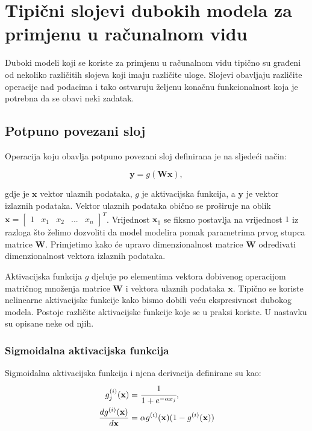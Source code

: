 \documentclass[times, utf8, diplomski, numeric]{fer}
\begin{document}
\section{Tipični slojevi dubokih modela za primjenu u računalnom vidu}
Duboki modeli koji se koriste za primjenu u računalnom vidu tipično su građeni od nekoliko različitih slojeva koji imaju različite uloge.
Slojevi obavljaju različite operacije nad podacima i tako ostvaruju željenu konačnu funkcionalnost koja je potrebna da se obavi neki zadatak.

\subsection{Potpuno povezani sloj}
Operacija koju obavlja potpuno povezani sloj definirana je na sljedeći način:

\begin{equation}
 \mathbf{y}=g(\mathbf{W}\mathbf{x}),
\end{equation}

\noindent gdje je $\mathbf{x}$ vektor ulaznih podataka, $g$ je aktivacijska funkcija, a  $\mathbf{y}$ je vektor izlaznih podataka. 
Vektor ulaznih podataka obično se proširuje na oblik $\mathbf{x} = \begin{bmatrix} 1 & x_1 & x_2 & ... & x_n \end{bmatrix}^T$.
Vrijednost $\mathbf{x}_1$ se fiksno postavlja na vrijednost $1$ iz razloga što želimo dozvoliti da model modelira pomak parametrima prvog stupca matrice $\mathbf{W}$.
Primjetimo kako će upravo dimenzionalnost matrice $\mathbf{W}$ određivati dimenzionalnost vektora izlaznih podataka.

Aktivacijska funkcija $g$ djeluje po elementima vektora dobivenog operacijom matričnog množenja matrice $\mathbf{W}$ i vektora ulaznih podataka $\mathbf{x}$.
Tipično se koriste nelinearne aktivacijske funkcije kako bismo dobili veću ekspresivnost dubokog modela.
Postoje različite aktivacijske funkcije koje se u praksi koriste. U nastavku su opisane neke od njih.

\subsubsection{Sigmoidalna aktivacijska funkcija}
Sigmoidalna aktivacijska funkcija i njena derivacija definirane su kao: 
\begin{align}
 g^{(i)}_j(\mathbf{x})&=\cfrac{1}{1+e^{-\alpha x_j}}, \\
 \frac{dg^{(i)}(\mathbf{x})}{d\mathbf{x}}&=\alpha g^{(i)}(\mathbf{x}) (1-g^{(i)}(\mathbf{x})) \label{eq:sigmoid_derivative}
\end{align}
\end{document}
